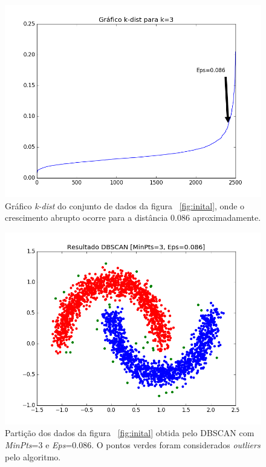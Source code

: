 \begin{figure}[h!]
	\includegraphics[width=\linewidth]{figuras/k_dist.png}
	\caption{Gráfico \emph{k-dist} do conjunto de dados da figura ~\ref{fig:inital}, onde o crescimento abrupto ocorre para a distância 0.086 aproximadamente.}
	\label{fig:k_dist}
\end{figure}

\begin{figure}[h!]
	\includegraphics[width=\linewidth]{figuras/result.png}
	\caption{Partição dos dados da figura ~\ref{fig:inital} obtida pelo DBSCAN com \emph{MinPts}=$3$ e \emph{Eps}=$0.086$. O pontos verdes foram considerados \emph{outliers} pelo algoritmo.}
	\label{fig:result}
\end{figure}

